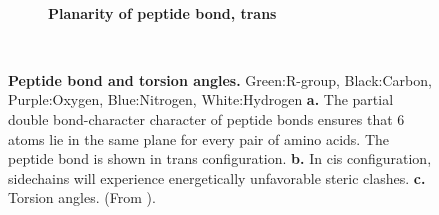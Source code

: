 \begin{figure}[h!]
\begin{subfigure}[b]{0.32\linewidth}
		\caption{\textbf{Planarity of peptide bond, trans}}
		\label{fig:trans}
	~\end{subfigure}
	\caption{
		\textbf{Peptide bond and torsion angles.}
	Green:R-group,
	Black:Carbon,
	Purple:Oxygen, 
	Blue:Nitrogen,
	White:Hydrogen
		\textbf{a.}
	The partial double bond-character character of peptide bonds ensures that 6 atoms lie in the same plane for every pair of amino acids. 
	The peptide bond is shown in trans configuration.
		\textbf{b.}
	In cis configuration, sidechains will experience energetically unfavorable steric clashes.
		\textbf{c.}
	Torsion angles.
	(From \cite{berg2015}).
	}
~\end{figure}
